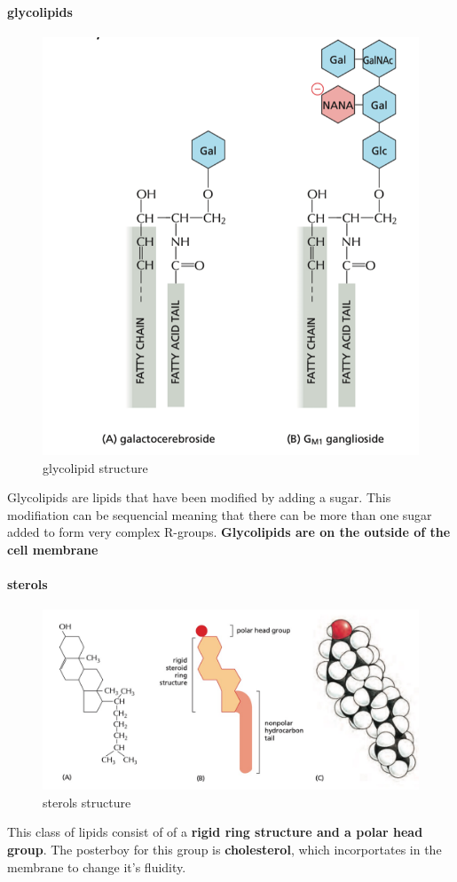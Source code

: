 \documentclass[../main.tex]{subfiles}
\begin{document}
        \paragraph{glycolipids}
        \begin{figure}[H]
            \centering
            \includegraphics[width=0.3\linewidth]{glycolipids.png}
            \caption{glycolipid structure}
            \label{fig:enter-label}
        \end{figure}
        Glycolipids are lipids that have been modified by adding a sugar. This modifiation can be sequencial meaning that there can be more than one sugar added to form very complex R-groups. \textbf{Glycolipids are on the outside of the cell membrane}

    
        \paragraph{sterols}
        \begin{figure}[H]
            \centering
            \includegraphics[width=0.5\linewidth]{Sum_Cell_Bio_II//lectures//cbII1/sterols.png}
            \caption{sterols structure}
            \label{fig:enter-label}
        \end{figure}
        This class of lipids consist of of a \textbf{rigid ring structure and a polar head group}. The posterboy for this group is \textbf{cholesterol}, which incorportates in the membrane to change it's fluidity.
\end{document}

